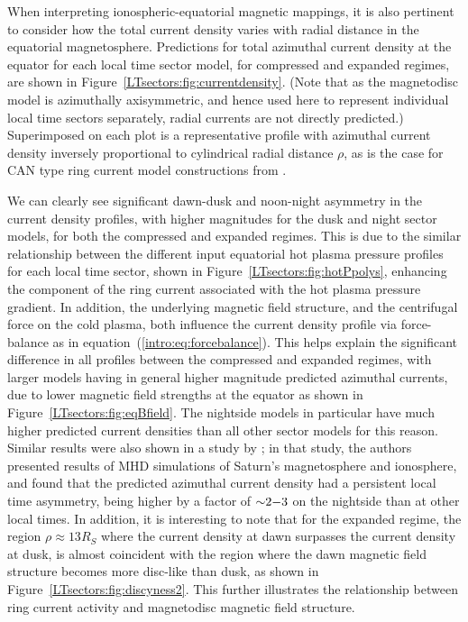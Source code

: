 When interpreting ionospheric-equatorial magnetic mappings, it is also pertinent to consider how the total current density varies with radial distance in the equatorial magnetosphere. Predictions for total azimuthal current density at the equator for each local time sector model, for compressed and expanded regimes, are shown in Figure~\ref{LTsectors:fig:currentdensity}. (Note that as the magnetodisc model is azimuthally axisymmetric, and hence used here to represent individual local time sectors separately, radial currents are not directly predicted.) Superimposed on each plot is a representative profile with azimuthal current density inversely proportional to cylindrical radial distance $\rho$, as is the case for CAN type ring current model constructions from \citet{connerney1981b,connerney1983}.

We can clearly see significant dawn-dusk and noon-night asymmetry in the current density profiles, with higher magnitudes for the dusk and night sector models, for both the compressed and expanded regimes. This is due to the similar relationship between the different input equatorial hot plasma pressure profiles for each local time sector, shown in Figure~\ref{LTsectors:fig:hotPpolys}, enhancing the component of the ring current associated with the hot plasma pressure gradient. In addition, the underlying magnetic field structure, and the centrifugal force on the cold plasma, both influence the current density profile via force-balance as in equation~(\ref{intro:eq:forcebalance}). This helps explain the significant difference in all profiles between the compressed and expanded regimes, with larger models having in general higher magnitude predicted azimuthal currents, due to lower magnetic field strengths at the equator as shown in Figure~\ref{LTsectors:fig:eqBfield}. The nightside models in particular have much higher predicted current densities than all other sector models for this reason. Similar results were also shown in a study by \citet{jia2012a}; in that study, the authors presented results of MHD simulations of Saturn's magnetosphere and ionosphere, and found that the predicted azimuthal current density had a persistent local time asymmetry, being higher by a factor of ${\sim}2{\--}3$ on the nightside than at other local times. In addition, it is interesting to note that for the expanded regime, the region $\rho \approx {13}{R_S}$ where the current density at dawn surpasses the current density at dusk, is almost coincident with the region where the dawn magnetic field structure becomes more disc-like than dusk, as shown in Figure~\ref{LTsectors:fig:discyness2}. This further illustrates the relationship between ring current activity and magnetodisc magnetic field structure.

